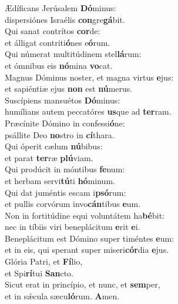 \evenverse Ædíficans Jerúsalem \textbf{Dó}minus:~\*\\
\evenverse dispersiónes Israélis \textbf{con}gre\textbf{gá}bit.\\
\oddverse Qui sanat contrítos \textbf{cor}de:~\*\\
\oddverse et álligat contriti\textbf{ó}nes e\textbf{ó}rum.\\
\evenverse Qui númerat multitúdinem stel\textbf{lá}rum:~\*\\
\evenverse et ómnibus eis \textbf{nó}mina \textbf{vo}cat.\\
\oddverse Magnus Dóminus noster, et magna virtus \textbf{e}jus:~\*\\
\oddverse et sapiéntiæ ejus \textbf{non} est \textbf{nú}merus.\\
\evenverse Suscípiens mansuétos \textbf{Dó}minus:~\*\\
\evenverse humílians autem peccatóres \textbf{us}que ad \textbf{ter}ram.\\
\oddverse Præcínite Dómino in confessi\textbf{ó}ne:~\*\\
\oddverse psállite Deo \textbf{no}stro in \textbf{cí}thara.\\
\evenverse Qui óperit cælum \textbf{nú}bibus:~\*\\
\evenverse et parat \textbf{ter}ræ \textbf{plú}viam.\\
\oddverse Qui prodúcit in móntibus \textbf{fe}num:~\*\\
\oddverse et herbam servi\textbf{tú}ti \textbf{hó}minum.\\
\evenverse Qui dat juméntis escam i\textbf{psó}rum:~\*\\
\evenverse et pullis corvórum invo\textbf{cán}tibus \textbf{e}um.\\
\oddverse Non in fortitúdine equi voluntátem ha\textbf{bé}bit:~\*\\
\oddverse nec in tíbiis viri beneplácitum \textbf{e}rit \textbf{e}i.\\
\evenverse Beneplácitum est Dómino super timéntes \textbf{e}um:~\*\\
\evenverse et in eis, qui sperant super miseri\textbf{cór}dia \textbf{e}jus.\\
\oddverse Glória Patri, et \textbf{Fí}lio,~\*\\
\oddverse et Spi\textbf{rí}tui \textbf{San}cto.\\
\evenverse Sicut erat in princípio, et nunc, et \textbf{sem}per,~\*\\
\evenverse et in sǽcula sæcu\textbf{ló}rum. \textbf{A}men.\\
